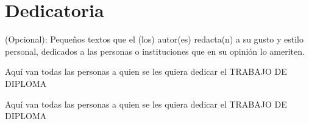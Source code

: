\section*{\large Dedicatoria}


(Opcional): Pequeños textos que el (los) autor(es) redacta(n) a su gusto y estilo personal, dedicados a las personas o instituciones que en su opinión lo ameriten.

\begin{center}
 	\bf{\autorUNO}
\end{center}


Aquí van todas las personas a quien se les quiera dedicar el TRABAJO DE DIPLOMA

\begin{center}
 	\bf{\autorDOS}
\end{center}

Aquí van todas las personas a quien se les quiera dedicar el TRABAJO DE DIPLOMA